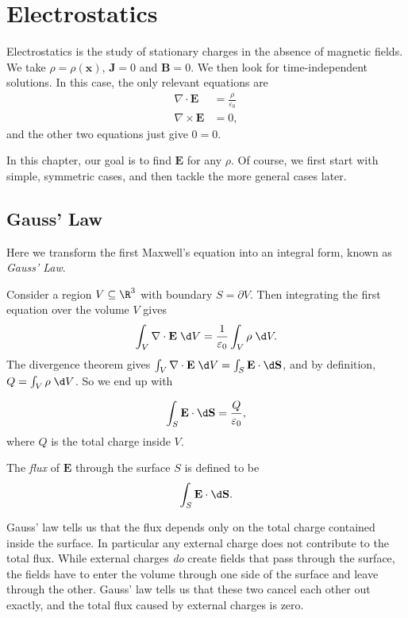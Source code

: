 \documentclass[a4paper]{article}
\begin{document}
\section{Electrostatics}
Electrostatics is the study of stationary charges in the absence of magnetic fields. We take $\rho = \rho(\mathbf{x})$, $\mathbf{J} = 0$ and $\mathbf{B} = 0$. We then look for time-independent solutions. In this case, the only relevant equations are
\begin{align*}
  \nabla \cdot \mathbf{E} &= \frac{\rho}{\varepsilon_0}\\
  \nabla\times \mathbf{E} &= 0,
\end{align*}
and the other two equations just give $0 = 0$.

In this chapter, our goal is to find $\mathbf{E}$ for any $\rho$. Of course, we first start with simple, symmetric cases, and then tackle the more general cases later.

\subsection{Gauss' Law}
Here we transform the first Maxwell's equation into an integral form, known as \emph{Gauss' Law}.

Consider a region $V\subseteq \R^3$ with boundary $S = \partial V$. Then integrating the first equation over the volume $V$ gives
\[
  \int_V \nabla\cdot \mathbf{E}\; \d V = \frac{1}{\varepsilon_0} \int_V \rho \;\d V.
\]
The divergence theorem gives $\int_V \nabla\cdot \mathbf{E}\;\d V = \int_S \mathbf{E}\cdot \d \mathbf{S}$, and by definition, $Q = \int_V \rho \;\d V$. So we end up with
\begin{law}
  \[
    \int_S \mathbf{E}\cdot \d \mathbf{S} =\frac{Q}{\varepsilon_0},
  \]
  where $Q$ is the total charge inside $V$.
\end{law}
\begin{defi}
  The \emph{flux} of $\mathbf{E}$ through the surface $S$ is defined to be
  \[
    \int_S \mathbf{E} \cdot\d \mathbf{S}.
  \]
\end{defi}

Gauss' law tells us that the flux depends only on the total charge contained inside the surface. In particular any external charge does not contribute to the total flux. While external charges \emph{do} create fields that pass through the surface, the fields have to enter the volume through one side of the surface and leave through the other. Gauss' law tells us that these two cancel each other out exactly, and the total flux caused by external charges is zero.
\end{document}
